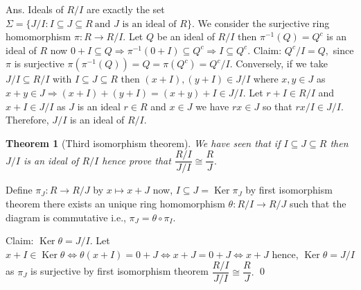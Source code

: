 \documentclass[11pt]{amsart}
\newtheorem{theorem}{Theorem}[section]
\begin{document}
Ans. Ideals of $R/I$ are exactly the set $\Sigma=\{J/I:I\subseteq J\subseteq R ~\text{and $J$ is an ideal of $R$}\}.$ We consider the surjective ring homomorphism $\pi:R\to R/I.$ Let $Q$ be an ideal of $R/I$ then $\pi^{-1}(Q)=Q^c$ is an ideal of $R$ now $0+I\subseteq Q \Rightarrow \pi^{-1}(0+I)\subseteq Q^c \Rightarrow I\subseteq Q^c.$ Claim: $Q^c/I=Q,$ since $\pi$ is surjective $\pi(\pi^{-1}(Q))=Q=\pi(Q^c)=Q^c/I.$ Conversely, if we take $J/I\subseteq R/I$ with $I \subseteq J\subseteq R$ then $(x+I),(y+I)\in J/I$ where $x,y\in J$ as $x+y\in J\Rightarrow (x+I)+(y+I)=(x+y)+I\in J/I.$ Let $r+I\in R/I$ and $x+I\in J/I$ as $J$ is an ideal $r\in R$ and $x\in J$ we have $rx\in J$ so that $rx/I\in J/I.$ Therefore, $J/I$ is an ideal of $R/I.$ 
\begin{theorem}[Third isomorphism theorem]
We have seen that if $I\subseteq J\subseteq R$ then $J/I$ is an ideal of $R/I$ hence prove that $\dfrac{R/I}{J/I}\cong  \dfrac{R}{J}.$
\end{theorem}
\proof Define $\pi_{J}:R\to R/J$ by $x\mapsto x+J$ now, $I\subseteq J=\operatorname{Ker}\pi_{J}$ by first isomorphism theorem there exists an unique ring homomorphism $\theta:R/I\to R/J$ such that the diagram is commutative i.e., $\pi_{J}=\theta\circ \pi_{I}.$ \begin{center}
\end{center}
Claim: $\operatorname{Ker}\theta=J/I.$ Let $x+I\in \operatorname{Ker}\theta \Leftrightarrow \theta(x+I)=0+J \Leftrightarrow x+J=0+J \Leftrightarrow x+J$ hence, $\operatorname{Ker} \theta=J/I$ as $\pi_{J}$ is surjective by first isomorphism theorem $\dfrac{R/I}{J/I}\cong \dfrac{R}{J}.$ \qed
\end{document}
